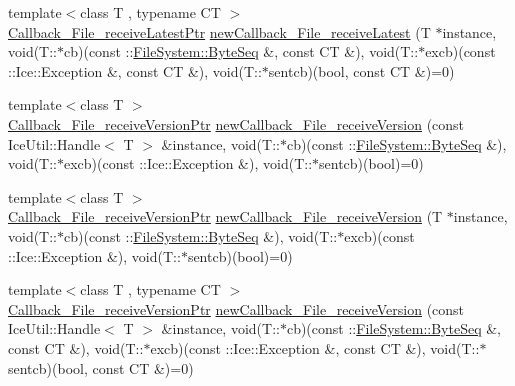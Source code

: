 \begin{DoxyCompactItemize}
\item 
{\footnotesize template$<$class T , typename C\+T $>$ }\\\hyperlink{namespace_file_system_a86fe38e325e02ddd26f665f486d51837}{Callback\+\_\+\+File\+\_\+receive\+Latest\+Ptr} \hyperlink{namespace_file_system_ab3edd75e3503f455de67f53659888e54}{new\+Callback\+\_\+\+File\+\_\+receive\+Latest} (T $\ast$instance, void(T\+::$\ast$cb)(const \+::\hyperlink{namespace_file_system_a5c85de065f9c451ae1d1dea2dacb68c5}{File\+System\+::\+Byte\+Seq} \&, const C\+T \&), void(T\+::$\ast$excb)(const \+::Ice\+::\+Exception \&, const C\+T \&), void(T\+::$\ast$sentcb)(bool, const C\+T \&)=0)
\item 
{\footnotesize template$<$class T $>$ }\\\hyperlink{namespace_file_system_a9f139d463637347415d1d3dadefe9bad}{Callback\+\_\+\+File\+\_\+receive\+Version\+Ptr} \hyperlink{namespace_file_system_a42d5739a2f8c21dd11147976f3899b6a}{new\+Callback\+\_\+\+File\+\_\+receive\+Version} (const Ice\+Util\+::\+Handle$<$ T $>$ \&instance, void(T\+::$\ast$cb)(const \+::\hyperlink{namespace_file_system_a5c85de065f9c451ae1d1dea2dacb68c5}{File\+System\+::\+Byte\+Seq} \&), void(T\+::$\ast$excb)(const \+::Ice\+::\+Exception \&), void(T\+::$\ast$sentcb)(bool)=0)
\item 
{\footnotesize template$<$class T $>$ }\\\hyperlink{namespace_file_system_a9f139d463637347415d1d3dadefe9bad}{Callback\+\_\+\+File\+\_\+receive\+Version\+Ptr} \hyperlink{namespace_file_system_a03da11fc8fef703e71e714806a453d0f}{new\+Callback\+\_\+\+File\+\_\+receive\+Version} (T $\ast$instance, void(T\+::$\ast$cb)(const \+::\hyperlink{namespace_file_system_a5c85de065f9c451ae1d1dea2dacb68c5}{File\+System\+::\+Byte\+Seq} \&), void(T\+::$\ast$excb)(const \+::Ice\+::\+Exception \&), void(T\+::$\ast$sentcb)(bool)=0)
\item 
{\footnotesize template$<$class T , typename C\+T $>$ }\\\hyperlink{namespace_file_system_a9f139d463637347415d1d3dadefe9bad}{Callback\+\_\+\+File\+\_\+receive\+Version\+Ptr} \hyperlink{namespace_file_system_aca4582991eb93cb8a1826c2387679604}{new\+Callback\+\_\+\+File\+\_\+receive\+Version} (const Ice\+Util\+::\+Handle$<$ T $>$ \&instance, void(T\+::$\ast$cb)(const \+::\hyperlink{namespace_file_system_a5c85de065f9c451ae1d1dea2dacb68c5}{File\+System\+::\+Byte\+Seq} \&, const C\+T \&), void(T\+::$\ast$excb)(const \+::Ice\+::\+Exception \&, const C\+T \&), void(T\+::$\ast$sentcb)(bool, const C\+T \&)=0)
\item 

\end{DoxyCompactItemize}
